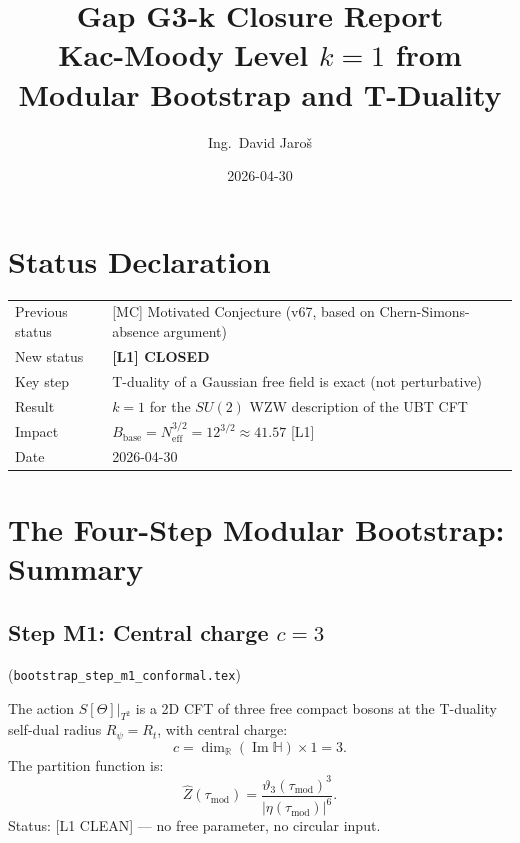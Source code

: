 \documentclass[12pt,a4paper]{article}
\title{\textbf{Gap G3-k Closure Report}\\
         \large Kac-Moody Level $k=1$ from Modular Bootstrap and T-Duality}
\author{Ing.\ David Jaro\v{s}}
\date{2026-04-30}
\theoremstyle{definition}
\theoremstyle{remark}
\begin{document}
  \maketitle
\fi

\section{Status Declaration}
\label{sec:g3k:status}

\begin{tcolorbox}[colback=green!6!white, colframe=green!60!black,
                  title=\textbf{Gap G3-k — Upgraded Status}]
\begin{tabular}{ll}
Previous status & [MC] Motivated Conjecture (v67, based on Chern-Simons-absence argument) \\
New status      & \textbf{[L1] CLOSED} \\
Key step        & T-duality of a Gaussian free field is exact (not perturbative) \\
Result          & $k = 1$ for the $SU(2)$ WZW description of the UBT CFT \\
Impact          & $B_{\mathrm{base}} = N_{\mathrm{eff}}^{3/2} = 12^{3/2} \approx 41.57$ [L1] \\
Date            & 2026-04-30 \\
\end{tabular}
\end{tcolorbox}

\section{The Four-Step Modular Bootstrap: Summary}
\label{sec:g3k:bootstrap}

\subsection*{Step M1: Central charge $c = 3$}
(\texttt{bootstrap\_step\_m1\_conformal.tex})

\begin{resultbox}
The action $S[\Theta]|_{T^2}$ is a 2D CFT of three free compact bosons at the
T-duality self-dual radius $R_\psi = R_t$, with central charge:
\begin{equation}
  c = \dim_\mathbb{R}(\operatorname{Im}\mathbb{H}) \times 1 = 3.
  \label{eq:g3k:c3}
\end{equation}
The partition function is:
\begin{equation}
  \hat{Z}(\tau_{\mathrm{mod}})
  = \frac{\vartheta_3(\tau_{\mathrm{mod}})^3}{|\eta(\tau_{\mathrm{mod}})|^6}.
  \label{eq:g3k:Zhat}
\end{equation}
Status: [L1 CLEAN] — no free parameter, no circular input.
\end{resultbox}
\end{document}
